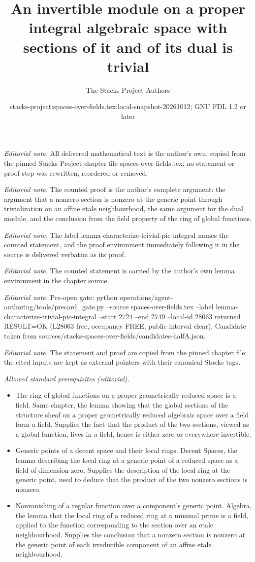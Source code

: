 \documentclass[10pt,a4paper]{amsart}
\title{An invertible module on a proper integral algebraic space with sections of it and of its dual is trivial}
\author{The Stacks Project Authors}
\date{stacks-project:spaces-over-fields.tex:local-snapshot-20261012; GNU FDL 1.2 or later}
\theoremstyle{plain}
\theoremstyle{definition}
\theoremstyle{remark}
\numberwithin{equation}{subsection}
\begin{document}
\maketitle
\noindent\textit{Editorial note.} All delivered mathematical text is the author's own, copied from the pinned Stacks Project chapter file spaces-over-fields.tex; no statement or proof step was rewritten, reordered or removed.\par\medskip
\noindent\textit{Editorial note.} The counted proof is the author's complete argument: the argument that a nonzero section is nonzero at the generic point through trivialization on an affine etale neighbourhood, the same argument for the dual module, and the conclusion from the field property of the ring of global functions.\par\medskip
\noindent\textit{Editorial note.} The label lemma-characterize-trivial-pic-integral names the counted statement, and the proof environment immediately following it in the source is delivered verbatim as its proof.\par\medskip
\noindent\textit{Editorial note.} The counted statement is carried by the author's own lemma environment in the chapter source.\par\medskip
\noindent\textit{Editorial note.} Pre-open gate: python operations/agent-authoring/tools/precard\_gate.py --source spaces-over-fields.tex --label lemma-characterize-trivial-pic-integral --start 2724 --end 2749 --local-id 28063 returned RESULT=OK (L28063 free, occupancy FREE, public interval clear). Candidate taken from sources/stacks-spaces-over-fields/candidates-halfA.json.\par\medskip
\noindent\textit{Editorial note.} The statement and proof are copied from the pinned chapter file; the cited inputs are kept as external pointers with their canonical Stacks tags.\par\medskip
\noindent\textit{Allowed standard prerequisites (editorial).}\begin{itemize}
\item The ring of global functions on a proper geometrically reduced space is a field. Same chapter, the lemma showing that the global sections of the structure sheaf on a proper geometrically reduced algebraic space over a field form a field. Supplies the fact that the product of the two sections, viewed as a global function, lives in a field, hence is either zero or everywhere invertible.
\item Generic points of a decent space and their local rings. Decent Spaces, the lemma describing the local ring at a generic point of a reduced space as a field of dimension zero. Supplies the description of the local ring at the generic point, used to deduce that the product of the two nonzero sections is nonzero.
\item Nonvanishing of a regular function over a component's generic point. Algebra, the lemma that the local ring of a reduced ring at a minimal prime is a field, applied to the function corresponding to the section over an etale neighbourhood. Supplies the conclusion that a nonzero section is nonzero at the generic point of each irreducible component of an affine etale neighbourhood.
\end{itemize}\medskip
\end{document}
